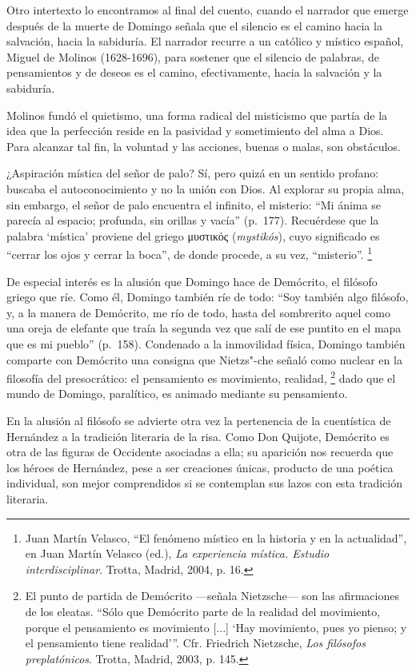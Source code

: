 \documentclass[14pt,twoside,final]{extbook} %
\let\oldfootnote\footnote
\renewcommand\footnote[1]{%
\oldfootnote{\hspace{1mm}#1}}
\begin{document}
Otro intertexto lo encontramos al final del cuento, cuando el narrador que emerge después de la muerte de Domingo señala que el silencio es el camino hacia la salvación, hacia la sabiduría. El narrador recurre a un católico y místico español, Miguel de Molinos (1628-1696), para sostener que el silencio de palabras, de pensamientos y de deseos es el camino, efectivamente, hacia la salvación y la sabiduría.

Molinos fundó el quietismo, una forma radical del misticismo que partía de la idea que la perfección reside en la pasividad y sometimiento del alma a Dios. Para alcanzar tal fin, la voluntad y las acciones, buenas o malas, son obstáculos.

¿Aspiración mística del señor de palo? Sí, pero quizá en un sentido profano: buscaba el autoconocimiento y no la unión con Dios. Al explorar su propia alma, sin embargo, el señor de palo encuentra el infinito, el misterio: ``Mi ánima se parecía al espacio; profunda, sin orillas y vacía'' (p.~177). Recuérdese que la palabra `mística' proviene del griego \textgreek{μυστικός} (\emph{mystikós}), cuyo significado es ``cerrar los ojos y cerrar la boca'', de donde procede, a su vez, ``misterio''.\footnote{Juan Martín Velasco, ``El fenómeno místico en la historia y en la actualidad'', en Juan Martín Velasco (ed.), \emph{La experiencia mística. Estudio interdisciplinar}. Trotta, Madrid, 2004, p. 16.}

De especial interés es la alusión que Domingo hace de Demócrito, el filósofo griego que ríe. Como él, Domingo también ríe de todo: ``Soy también algo filósofo, y, a la manera de Demócrito, me río de todo, hasta del sombrerito aquel como una oreja de elefante que traía la segunda vez que salí de ese puntito en el mapa que es mi pueblo'' (p.~158). Condenado a la inmovilidad física, Domingo también comparte con Demócrito una consigna que Nietzs"-che señaló como nuclear en la filosofía del presocrático: el pensamiento es movimiento, realidad,\footnote{El punto de partida de Demócrito ---señala Nietzsche--- son las afirmaciones de los eleatas. ``Sólo que Demócrito parte de la realidad del movimiento, porque el pensamiento es movimiento [...] `Hay movimiento, pues yo pienso; y el pensamiento tiene realidad'{}''. Cfr. Friedrich Nietzsche, \emph{Los filósofos preplatónicos}. Trotta, Madrid, 2003, p. 145.} dado que el mundo de Domingo, paralítico, es animado mediante su pensamiento.

En la alusión al filósofo se advierte otra vez la pertenencia de la cuentística de Hernández a la tradición literaria de la risa. Como Don Quijote, Demócrito es otra de las figuras de Occidente asociadas a ella; su aparición nos recuerda que los héroes de Hernández, pese a ser creaciones únicas, producto de una poética individual, son mejor comprendidos si se contemplan sus lazos con esta tradición literaria.
\end{document}
